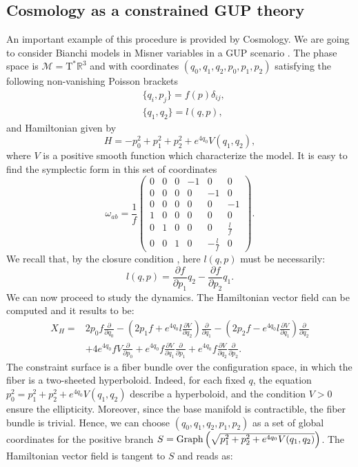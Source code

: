\documentclass{article}
\numberwithin{equation}{section}
\theoremstyle{definition}
\newcommand{\R}{\mathbb{R}}
\newcommand{\M}{\mathcal{M}}
\newcommand{\T}{\mathrm{T}}
\newcommand{\pder}[2]{\frac{\partial #1}{\partial #2}}
\begin{document}
\subsection{Cosmology as a constrained GUP theory}
An important example of this procedure is provided by Cosmology. We are going to consider Bianchi models in Misner variables in a GUP scenario \cite{ Misner:1969ae}. The phase space is $\M=\T^*\R^3$ and with coordinates $(q_0,q_1,q_2,p_0,p_1,p_2)$ satisfying the following non-vanishing Poisson brackets
\begin{equation}
    \begin{split}
        &\{q_i,p_j\}=f(p)\delta_{ij},\\
        &\{q_1,q_2\}=l(q,p),
    \end{split}
\end{equation}
and Hamiltonian given by
\begin{equation}
    H=-p_0^2+p_1^2+p_2^2+e^{4q_0}V(q_1,q_2),
\end{equation}
where $V$ is a positive smooth function which characterize the model. It is easy to find the symplectic form in this set of coordinates
\begin{equation}
     \omega_{ab}=\frac{1}{f}
    \begin{pmatrix}
    0 & 0 & 0 &-1 & 0 & 0\\
    0 & 0 & 0 & 0 &-1 & 0\\
    0 & 0 & 0 & 0 & 0 & -1\\
    1 & 0 & 0 & 0 & 0 & 0\\
    0 & 1 & 0 & 0 & 0 & \frac{l}{f}\\
    0 & 0 & 1 & 0 &-\frac{l}{f} & 0
   \end{pmatrix}.
\end{equation}
We recall that, by the closure condition \cite{Bruno_Segreto_2024}, here $l(q,p)$ must be necessarily:
\[l(q,p)=\pder{f}{p_1}q_2-\pder{f}{p_2}q_1.\]
We can now proceed to study the dynamics. The Hamiltonian vector field can be computed and it results to be:
\begin{equation}
    \begin{split}
        X_H=&2p_0f\pder{}{q_0}-\left(2p_1f+e^{4q_0}l\pder{V}{q_2}\right)\pder{}{q_1}-\left(2p_2f-e^{4q_0}l\pder{V}{q_1}\right)\pder{}{q_2}\\
        &+4e^{4q_0}fV\pder{}{p_0}+e^{4q_0}f\pder{V}{q_1}\pder{}{p_1}+e^{4q_0}f\pder{V}{q_2}\pder{}{p_2}.
    \end{split}
\end{equation}
The constraint surface is a fiber bundle over the configuration space, in which the fiber is a two-sheeted hyperboloid. Indeed, for each fixed $q$, the equation $p^2_0=p^2_1+p^2_2+e^{4q_0}V(q_1,q_2)$ describe a hyperboloid, and the condition $V>0$ ensure the ellipticity. Moreover, since the base manifold is contractible, the fiber bundle is trivial. Hence, we can choose $(q_0,q_1,q_2,p_1,p_2)$ as a set of global coordinates for the positive branch $S={\rm Graph}\left(\sqrt{p^2_1+p^2_2+e^{4q_0}V(q_1,q_2)}\right)$. The Hamiltonian vector field is tangent to $S$ and reads as:
\end{document}
